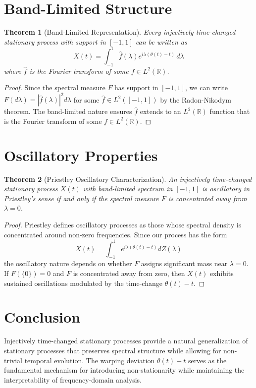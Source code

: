 \documentclass[11pt]{article}
\newtheorem{theorem}{Theorem}
\begin{document}
\section{Band-Limited Structure}

\begin{theorem}[Band-Limited Representation]
Every injectively time-changed stationary process with support in $[-1,1]$ can be written as
\begin{equation}
X(t) = \int_{-1}^1 \hat{f}(\lambda) e^{i\lambda(\theta(t)-t)} \, d\lambda
\end{equation}
where $\hat{f}$ is the Fourier transform of some $f \in L^2(\mathbb{R})$.
\end{theorem}

\begin{proof}
Since the spectral measure $F$ has support in $[-1,1]$, we can write $F(d\lambda) = |\hat{f}(\lambda)|^2 d\lambda$ for some $\hat{f} \in L^2([-1,1])$ by the Radon-Nikodym theorem. The band-limited nature ensures $\hat{f}$ extends to an $L^2(\mathbb{R})$ function that is the Fourier transform of some $f \in L^2(\mathbb{R})$.
\end{proof}

\section{Oscillatory Properties}

\begin{theorem}[Priestley Oscillatory Characterization]
An injectively time-changed stationary process $X(t)$ with band-limited spectrum in $[-1,1]$ is oscillatory in Priestley's sense if and only if the spectral measure $F$ is concentrated away from $\lambda = 0$.
\end{theorem}

\begin{proof}
Priestley defines oscillatory processes as those whose spectral density is concentrated around non-zero frequencies. Since our process has the form
\begin{equation}
X(t) = \int_{-1}^1 e^{i\lambda(\theta(t)-t)} dZ(\lambda)
\end{equation}
the oscillatory nature depends on whether $F$ assigns significant mass near $\lambda = 0$. If $F(\{0\}) = 0$ and $F$ is concentrated away from zero, then $X(t)$ exhibits sustained oscillations modulated by the time-change $\theta(t)-t$.
\end{proof}

\section{Conclusion}

Injectively time-changed stationary processes provide a natural generalization of stationary processes that preserves spectral structure while allowing for non-trivial temporal evolution. The warping deviation $\theta(t)-t$ serves as the fundamental mechanism for introducing non-stationarity while maintaining the interpretability of frequency-domain analysis.
\end{document}
